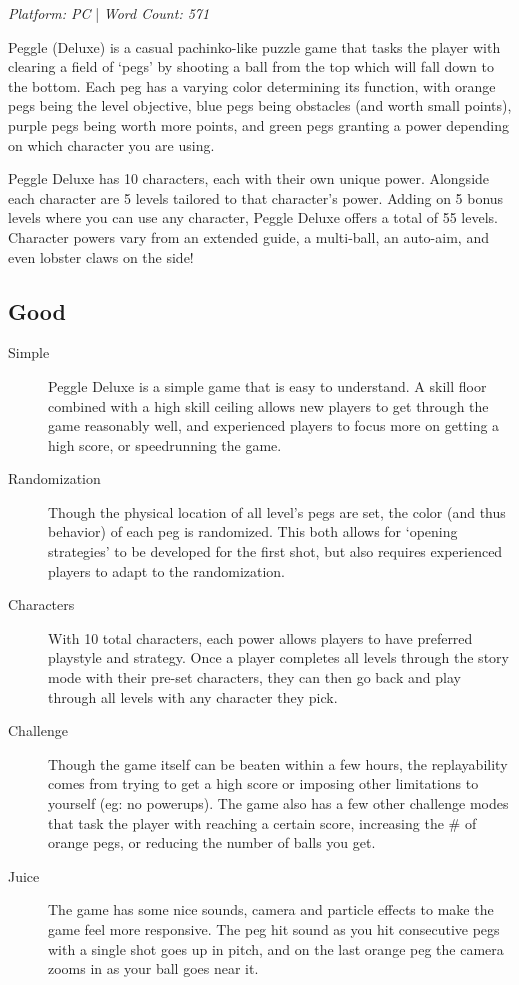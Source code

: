 \documentclass{article}
\begin{document}
\begin{center}
      \textit{Platform: PC} | \textit{Word Count: 571}
\end{center}

Peggle (Deluxe) is a casual pachinko-like puzzle game that tasks the player with
clearing a field of `pegs' by shooting a ball from the top which will fall down
to the bottom. Each peg has a varying color determining its function, with
orange pegs being the level objective, blue pegs being obstacles (and worth
small points), purple pegs being worth more points, and green pegs granting a
power depending on which character you are using.

Peggle Deluxe has 10 characters, each with their own unique power. Alongside
each character are 5 levels tailored to that character's power. Adding on 5
bonus levels where you can use any character, Peggle Deluxe offers a total of 55
levels. Character powers vary from an extended guide, a multi-ball, an auto-aim,
and even lobster claws on the side!

\subsection{Good}
\begin{description}
      \item[Simple] Peggle Deluxe is a simple game that is easy to understand. A
            skill floor combined with a high skill ceiling allows new players to get
            through the game reasonably well, and experienced players to focus more on
            getting a high score, or speedrunning the game.
      \item[Randomization] Though the physical location of all level's pegs are
            set, the color (and thus behavior) of each peg is randomized. This both
            allows for `opening strategies' to be developed for the first shot, but
            also requires experienced players to adapt to the randomization.
      \item[Characters] With 10 total characters, each power allows players to
            have  preferred playstyle and strategy. Once a player completes all levels
            through the story mode with their pre-set characters, they can then go
            back and play through all levels with any character they pick.
      \item[Challenge] Though the game itself can be beaten within a few hours,
            the replayability comes from trying to get a high score or imposing other
            limitations to yourself (eg: no powerups). The game also has a few other
            challenge modes that task the player with reaching a certain score,
            increasing the \# of orange pegs, or reducing the number of balls
            you get.
      \item[Juice] The game has some nice sounds, camera and particle effects to
            make the game feel more responsive. The peg hit sound as you hit
            consecutive pegs with a single shot goes up in pitch, and on the last
            orange peg the camera zooms in as your ball goes near it.
\end{description}
\end{document}
